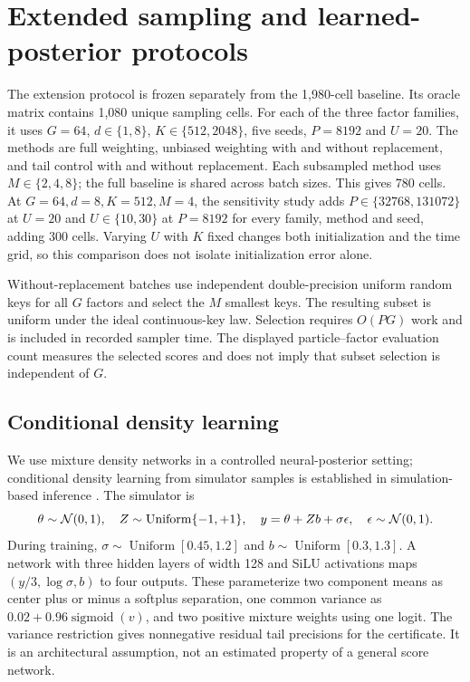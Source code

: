 \section{Extended sampling and learned-posterior protocols}\label{app:extension-protocol}
The extension protocol is frozen separately from the 1,980-cell baseline. Its oracle matrix contains 1,080 unique sampling cells. For each of the three factor families, it uses $G=64$, $d\in\{1,8\}$, $K\in\{512,2048\}$, five seeds, $P=8192$ and $U=20$. The methods are full weighting, unbiased weighting with and without replacement, and tail control with and without replacement. Each subsampled method uses $M\in\{2,4,8\}$; the full baseline is shared across batch sizes. This gives 780 cells. At $G=64,d=8,K=512,M=4$, the sensitivity study adds $P\in\{32768,131072\}$ at $U=20$ and $U\in\{10,30\}$ at $P=8192$ for every family, method and seed, adding 300 cells. Varying $U$ with $K$ fixed changes both initialization and the time grid, so this comparison does not isolate initialization error alone.

Without-replacement batches use independent double-precision uniform random keys for all $G$ factors and select the $M$ smallest keys. The resulting subset is uniform under the ideal continuous-key law. Selection requires $O(PG)$ work and is included in recorded sampler time. The displayed particle--factor evaluation count measures the selected scores and does not imply that subset selection is independent of $G$.

\subsection{Conditional density learning}
We use mixture density networks \citep{bishop1994} in a controlled neural-posterior setting; conditional density learning from simulator samples is established in simulation-based inference \citep{papamakarios2016}. The simulator is
\[
 \theta\sim\mathcal N(0,1),\quad Z\sim\operatorname{Uniform}\{-1,+1\},\quad
 y=\theta+Zb+\sigma\epsilon,\quad \epsilon\sim\mathcal N(0,1).
\]
During training, $\sigma\sim\operatorname{Uniform}[0.45,1.2]$ and $b\sim\operatorname{Uniform}[0.3,1.3]$. A network with three hidden layers of width 128 and SiLU activations maps $(y/3,\log\sigma,b)$ to four outputs. These parameterize two component means as center plus or minus a softplus separation, one common variance as $0.02+0.96\operatorname{sigmoid}(v)$, and two positive mixture weights using one logit. The variance restriction gives nonnegative residual tail precisions for the certificate. It is an architectural assumption, not an estimated property of a general score network.

